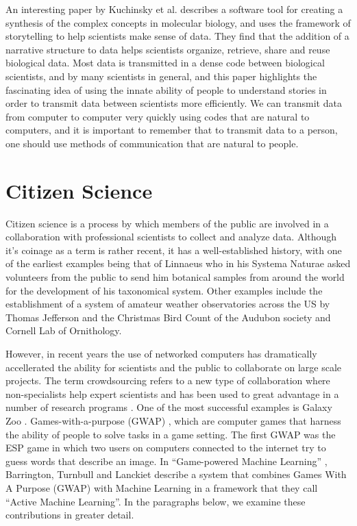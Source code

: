 \documentclass[12pt,oneside]{book}
\begin{document}
An interesting paper by Kuchinsky et al. \cite{kuchinsky02} describes
a software tool for creating a synthesis of the complex concepts in
molecular biology, and uses the framework of storytelling to help
scientists make sense of data.  They find that the addition of a
narrative structure to data helps scientists organize, retrieve, share
and reuse biological data.  Most data is transmitted in a dense code
between biological scientists, and by many scientists in general, and
this paper highlights the fascinating idea of using the innate ability
of people to understand stories in order to transmit data between
scientists more efficiently.  We can transmit data from computer to
computer very quickly using codes that are natural to computers, and
it is important to remember that to transmit data to a person, one
should use methods of communication that are natural to people.

\section{Citizen Science}
\label{section:relatedWork:citizenScience}

Citizen science is a process by which members of the public are
involved in a collaboration with professional scientists to collect
and analyze data.  Although it's coinage as a term is rather recent,
it has a well-established history, with one of the earliest examples
being that of Linnaeus who in his Systema Naturae \cite{linnaeus1758}
asked volunteers from the public to send him botanical samples from
around the world for the development of his taxonomical system.  Other
examples include the establishment of a system of amateur weather
observatories across the US by Thomas Jefferson \cite{fiebrich09} and
the Christmas Bird Count \cite{lebaron09} of the Audubon society and
Cornell Lab of Ornithology.

However, in recent years the use of networked computers has
dramatically accellerated the ability for scientists and the public to
collaborate on large scale projects.  The term crowdsourcing refers to
a new type of collaboration where non-specialists help expert
scientists \cite{howe08_crowdsourcing} and has been used to great
advantage \cite{surowiecki05_crowdsourcing} in a number
\cite{bradham08_crowdsourcing} of research programs
\cite{travis08_crowdsourcing}.  One of the most successful examples is
Galaxy Zoo \cite{anze08_galaxyzoo}. Games-with-a-purpose (GWAP)
\cite{vonahn08}, which are computer games that harness the ability of
people to solve tasks in a game setting.  The first GWAP was the ESP
game \cite{vonahn04} in which two users on computers connected to the
internet try to guess words that describe an image.  In ``Game-powered
Machine Learning'' \cite{barrington12}, Barrington, Turnbull and
Lanckiet describe a system that combines Games With A Purpose (GWAP)
with Machine Learning in a framework that they call ``Active Machine
Learning''.  In the paragraphs below, we examine these contributions
in greater detail.
\end{document}
